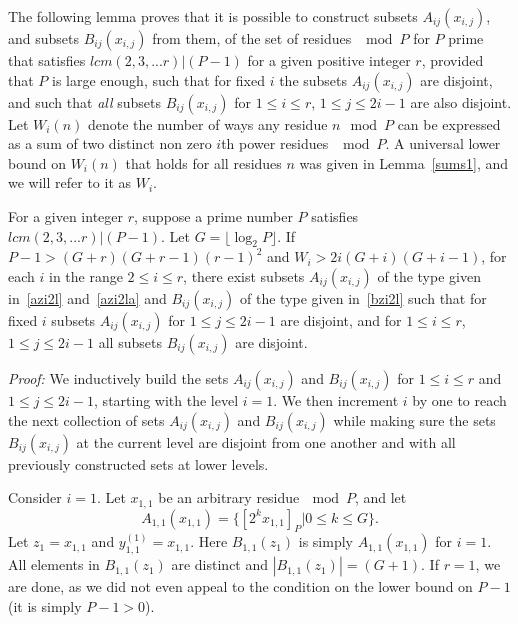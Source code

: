 The following lemma proves that it is possible to construct subsets
$A_{ij}(x_{i,j})$, and subsets $B_{ij}(x_{i,j})$ from them, of the
set of residues $\mod P$ for $P$ prime that satisfies $lcm(2,3,...r)
| (P-1)$ for a given positive integer $r$, provided that $P$ is
large enough, such that for fixed $i$ the subsets $A_{ij}(x_{i,j})$
are disjoint, and such that \emph{all} subsets $B_{ij}(x_{i,j})$ for
$1 \leq i \leq r$, $1 \leq j \leq 2i-1$ are also disjoint. Let
$W_i(n)$ denote the number of ways any residue $n\mod P$ can be
expressed as a sum of two distinct non zero $i$th power residues
$\mod P$. A universal lower bound on $W_i(n)$ that holds for all
residues $n$ was given in Lemma~\ref{sums1}, and we will refer to it
as $W_i$.
\begin{lemma}\label{lemmaw} For a given integer $r$, suppose a prime number $P$ satisfies $lcm(2,3,...r) |
(P-1)$. Let $G =\lfloor \log_2{P}\rfloor$. If $P-1 >
(G+r)(G+r-1)(r-1)^2$ and $W_i
> 2i(G+i)(G+i-1)$, for each $i$ in the range $2 \leq i \leq
r$, there exist subsets $A_{ij}(x_{i,j})$ of the type given
in~\eqref{azi2l} and~\eqref{azi2la} and $B_{ij}(x_{i,j})$ of the
type given in~\eqref{bzi2l}
 such that for fixed $i$ subsets $A_{ij}(x_{i,j})$ for $1 \leq j \leq 2i-1$ are disjoint, and
for $1 \leq i \leq r$, $1 \leq j \leq 2i-1$ all subsets
$B_{ij}(x_{i,j})$ are disjoint.
\end{lemma}
\noindent \textit{Proof:} We inductively build the sets
$A_{ij}(x_{i,j})$ and $B_{ij}(x_{i,j})$ for $1 \leq i \leq r$ and $1
\leq j \leq 2i-1$, starting with the level $i=1$. We then increment
$i$ by one to reach the next collection of sets $A_{ij}(x_{i,j})$
and $B_{ij}(x_{i,j})$ while making sure the sets $B_{ij}(x_{i,j})$
at the current level are disjoint from one another and with all
previously constructed sets at lower levels.

Consider $i=1$. Let $x_{1,1}$ be an arbitrary residue$~\mod P$, and
let
\[A_{1,1}(x_{1,1})=\{[2^{k}x_{1,1}]_P | 0 \leq k \leq G \}.\] Let $z_1=x_{1,1}$ and $y_{1,1}^{(1)}=x_{1,1}$. Here
$B_{1,1}(z_1)$ is simply $A_{1,1}(x_{1,1})$ for $i=1$. All elements
in $B_{1,1}(z_{1})$ are distinct and $|B_{1,1}(z_{1})| =(G+1)$. If
$r=1$, we are done, as we did not even appeal to the condition on
the lower bound on $P-1$ (it is simply $P-1>0$).

